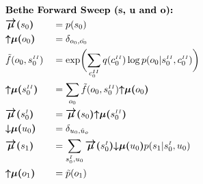 \documentclass[fleqn]{article}
\begin{document}
\noindent
\setlength{\jot}{0.3em}
\begin{minipage}[t]{0.5\textwidth}
    \begin{alignat}{2}
         & \rlap{\text{\bfseries Bethe Forward Sweep (s, u and o):}} \nonumber                                                                                                                                                                                    \\
         & \bm{\overrightarrow{\mu}(}s_0\bm{)}                                  &  & = p(s_0)                                                                                                                                                                     \\
         & \bm{{\uparrow}{\mu}(}o_0\bm{)}                                       &  & = \delta_{o_0, \hat{o_0}}                                                                                                                                                    \\
         & \tilde{f}(o_0,s^{\scriptscriptstyle II}_0)                           &  & = \exp \biggl(\sum_{c^{\scriptscriptstyle II}_0} q(c^{\scriptscriptstyle II}_0) \log p(o_0|s^{\scriptscriptstyle II}_0,c^{\scriptscriptstyle II}_0) \biggr)                  \\
         & \bm{{\uparrow}{\mu}(}s^{\scriptscriptstyle II}_0\bm{)}               &  & = \sum_{o_0} \tilde{f}(o_0,s^{\scriptscriptstyle II}_0) \bm{{\uparrow}{\mu}(}o_0\bm{)}                                                                                       \\
         & \bm{\overrightarrow{\mu}(}s^{\scriptscriptstyle I}_0\bm{)}           &  & = \bm{\overrightarrow{\mu}(}s_0\bm{)} \bm{{\uparrow}{\mu}(}s^{\scriptscriptstyle II}_0\bm{)}                                                                                 \\
         & \bm{{\downarrow}{\mu}(}u_0\bm{)}                                     &  & = \delta_{u_0,\hat{u}_o}                                                                                                                                                     \\
         & \bm{\overrightarrow{\mu}(}s_1\bm{)}                                  &  & = \sum_{s^{\scriptscriptstyle I}_0, u_0} \bm{\overrightarrow{\mu}(}s^{\scriptscriptstyle I}_0\bm{)} \bm{{\downarrow}{\mu}(}u_0\bm{)} p(s_1|{s^{\scriptscriptstyle I}_0},u_0) \\
         & \bm{{\uparrow}{\mu}(}o_1\bm{)}                                       &  & = \tilde{p}(o_1)                                                                                                                                                             \\

\end{alignat}
\end{minipage}
\end{document}
